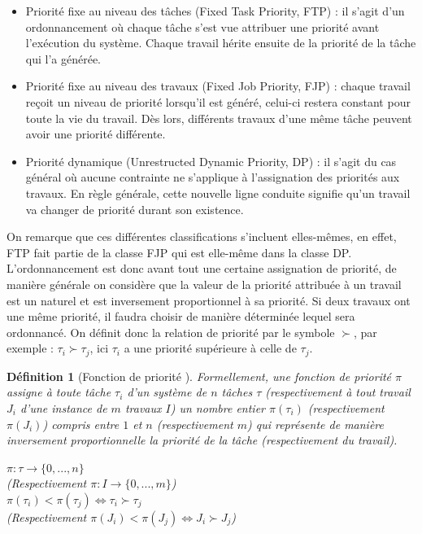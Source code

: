 \documentclass[a4paper]{report}
\theoremstyle{break}
\newtheorem{defin}{Définition}
\theoremstyle{breakplain}
\begin{document}
\begin{itemize}
\item Priorité fixe au niveau des tâches (Fixed Task Priority, FTP) : il s'agit d'un ordonnancement où chaque tâche s'est vue attribuer une priorité avant l'exécution du système. Chaque travail hérite ensuite de la priorité de la tâche qui l'a générée.
\item Priorité fixe au niveau des travaux (Fixed Job Priority, FJP) : chaque travail reçoit un niveau de priorité lorsqu'il est généré, celui-ci restera constant pour toute la vie du travail. Dès lors, différents travaux d'une même tâche peuvent avoir une priorité différente.
\item Priorité dynamique (Unrestructed Dynamic Priority, DP) : il s'agit du cas général où aucune contrainte ne s'applique à l'assignation des priorités aux travaux. En règle générale, cette nouvelle ligne conduite signifie qu'un travail va changer de priorité durant son existence.
\end{itemize}
On remarque que ces différentes classifications s'incluent elles-mêmes, en effet, FTP fait partie de la classe FJP qui est elle-même dans la classe DP.\\

L'ordonnancement est donc avant tout une certaine assignation de priorité, de manière générale on considère que la valeur de la priorité attribuée à un travail est un naturel et est inversement proportionnel à sa priorité. Si deux travaux ont une même priorité, il faudra choisir de manière déterminée lequel sera ordonnancé. On définit donc la relation de priorité par le symbole $\succ$, par exemple : $\tau_i \succ \tau_j$, ici $\tau_i$ a une priorité supérieure à celle de $\tau_j$.\\

\begin{defin}[Fonction de priorité \cite{santy2012ordonnancement}]
Formellement, une fonction de priorité $\pi$ assigne à toute tâche $\tau_i$ d'un système de $n$ tâches $\tau$ (respectivement à tout travail $J_i$ d'une instance de $m$ travaux $I$) un nombre entier $\pi(\tau_i)$ (respectivement $\pi(J_i)$) compris entre $1$ et $n$ (respectivement $m$) qui représente de manière inversement proportionnelle la priorité de la tâche (respectivement du travail).
\begin{center}
$\pi : \tau \rightarrow \{0,...,n \}$\\
(Respectivement $\pi : I \rightarrow \{0,...,m \}$)\\
$\pi(\tau_i) < \pi(\tau_j) \Leftrightarrow \tau_i \succ \tau_j$\\
(Respectivement $\pi(J_i) < \pi(J_j) \Leftrightarrow J_i \succ J_j$)
\end{center}
\end{defin}
\end{document}
